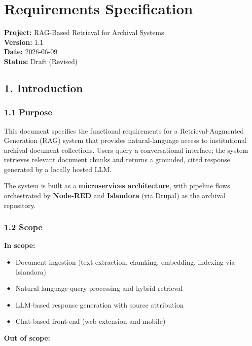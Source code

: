 \documentclass[
  11pt,
]{article}
\author{}
\date{}
\providecommand{\tightlist}{%
  \setlength{\itemsep}{0pt}\setlength{\parskip}{0pt}}
\begin{document}
\section{Requirements Specification}\label{requirements-specification}

\textbf{Project:} RAG-Based Retrieval for Archival Systems\\
\textbf{Version:} 1.1\\
\textbf{Date:} 2026-06-09\\
\textbf{Status:} Draft (Revised)

\subsection{1. Introduction}\label{introduction}

\subsubsection{1.1 Purpose}\label{purpose}

This document specifies the functional requirements for a
Retrieval-Augmented Generation (RAG) system that provides
natural-language access to institutional archival document collections.
Users query a conversational interface; the system retrieves relevant
document chunks and returns a grounded, cited response generated by a
locally hosted LLM.

The system is built as a \textbf{microservices architecture}, with
pipeline flows orchestrated by \textbf{Node-RED} and \textbf{Islandora}
(via Drupal) as the archival repository.

\subsubsection{1.2 Scope}\label{scope}

\textbf{In scope:}

\begin{itemize}
\tightlist
\item
  Document ingestion (text extraction, chunking, embedding, indexing via
  Islandora)
\item
  Natural language query processing and hybrid retrieval
\item
  LLM-based response generation with source attribution
\item
  Chat-based front-end (web extension and mobile)
\end{itemize}

\textbf{Out of scope:}
\end{document}
